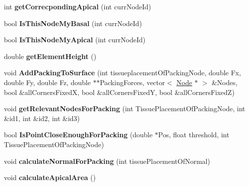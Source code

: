 \begin{DoxyCompactItemize}
\item 
\hypertarget{classPrism_a10377e0ad0ae454a3cd25b82709119ac}{}int {\bfseries get\+Correcponding\+Apical} (int curr\+Node\+Id)\label{classPrism_a10377e0ad0ae454a3cd25b82709119ac}

\item 
\hypertarget{classPrism_abe648c5fa60635a50c14186135bed332}{}bool {\bfseries Is\+This\+Node\+My\+Basal} (int curr\+Node\+Id)\label{classPrism_abe648c5fa60635a50c14186135bed332}

\item 
\hypertarget{classPrism_ab9f3b638a4068180a11add5921870230}{}bool {\bfseries Is\+This\+Node\+My\+Apical} (int curr\+Node\+Id)\label{classPrism_ab9f3b638a4068180a11add5921870230}

\item 
\hypertarget{classPrism_a91d08cfcf6bf111f5d9e314499bafd11}{}double {\bfseries get\+Element\+Height} ()\label{classPrism_a91d08cfcf6bf111f5d9e314499bafd11}

\item 
\hypertarget{classPrism_aea2d84b05534bb2aedcdb49a53eab1ae}{}void {\bfseries Add\+Packing\+To\+Surface} (int tissueplacement\+Of\+Packing\+Node, double Fx, double Fy, double Fz, double $\ast$$\ast$Packing\+Forces, vector$<$ \hyperlink{classNode}{Node} $\ast$ $>$ \&Nodes, bool \&all\+Corners\+Fixed\+X, bool \&all\+Corners\+Fixed\+Y, bool \&all\+Corners\+Fixed\+Z)\label{classPrism_aea2d84b05534bb2aedcdb49a53eab1ae}

\item 
\hypertarget{classPrism_a46221f023616a6c11b2387c75b99dcbe}{}void {\bfseries get\+Relevant\+Nodes\+For\+Packing} (int Tissue\+Placement\+Of\+Packing\+Node, int \&id1, int \&id2, int \&id3)\label{classPrism_a46221f023616a6c11b2387c75b99dcbe}

\item 
\hypertarget{classPrism_aec7672c8cf13ce1277e8004ddf0aa151}{}bool {\bfseries Is\+Point\+Close\+Enough\+For\+Packing} (double $\ast$Pos, float threshold, int Tissue\+Placement\+Of\+Packing\+Node)\label{classPrism_aec7672c8cf13ce1277e8004ddf0aa151}

\item 
\hypertarget{classPrism_acb1603367b049392cebfc20b3aaeab87}{}void {\bfseries calculate\+Normal\+For\+Packing} (int tissue\+Placement\+Of\+Normal)\label{classPrism_acb1603367b049392cebfc20b3aaeab87}

\item 
\hypertarget{classPrism_a67e80515fb1cdf4438b4b7d47334bd2e}{}void {\bfseries calculate\+Apical\+Area} ()\label{classPrism_a67e80515fb1cdf4438b4b7d47334bd2e}


\end{DoxyCompactItemize}
